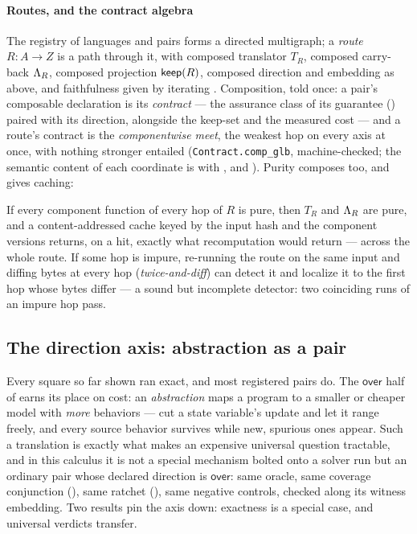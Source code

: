 \paragraph{Routes, and the contract algebra}
The registry of languages and pairs forms a directed multigraph; a
\emph{route} $R : A \to Z$ is a path through it, with composed translator
$T_R$, composed carry-back $\Lambda_R$, composed projection $\mathsf{keep}(R)$,
composed direction and embedding as above, and
faithfulness given by iterating . Composition, told
once: a pair's composable declaration is its \emph{contract} --- the
assurance class of its guarantee () paired with its
direction, alongside the keep-set and the measured cost --- and a
route's contract is the \emph{componentwise meet}, the weakest hop on
every axis at once, with nothing stronger entailed
(\texttt{Contract.comp\_glb}, machine-checked; the semantic content
of each coordinate is  with
, and ). Purity composes too,
and gives caching:

\begin{proposition}
\label{prop:cache}
If every component function of every hop of $R$ is pure, then $T_R$ and
$\Lambda_R$ are pure, and a content-addressed cache keyed by the input
hash and the component versions returns, on a hit, exactly what
recomputation would return --- across the whole route. If some hop is
impure, re-running the route on the same input and
diffing bytes at every hop (\emph{twice-and-diff}) can detect it and
localize it to the first hop whose bytes differ --- a sound but
incomplete detector: two coinciding runs of an impure hop pass.
\end{proposition}

\subsection{The direction axis: abstraction as a pair}
\label{sec:lax}

Every square so far shown ran exact, and most registered pairs do. The
$\mathsf{over}$ half of  earns its place on cost:
an \emph{abstraction} maps a program to a smaller or cheaper model with
\emph{more} behaviors --- cut a state variable's update and let it
range freely, and every source behavior survives while new, spurious
ones appear. Such a translation is exactly what makes an expensive
universal question tractable, and in this calculus it is not a special
mechanism bolted onto a solver run but an ordinary pair whose declared
direction is $\mathsf{over}$: same oracle, same coverage conjunction
(), same ratchet (), same
negative controls, checked along its witness embedding. Two results
pin the axis down: exactness is a special case, and universal verdicts
transfer.

